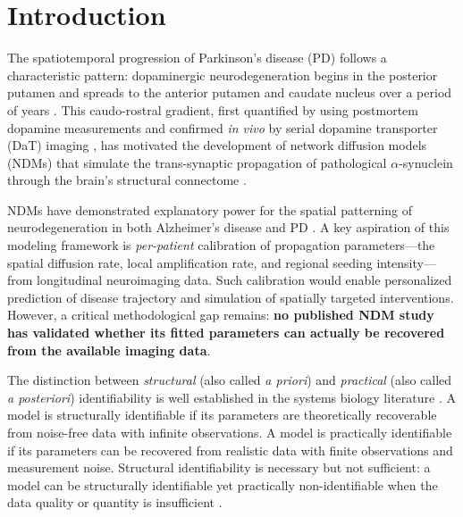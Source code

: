 \section{Introduction}

The spatiotemporal progression of Parkinson's disease (PD) follows a characteristic pattern: dopaminergic neurodegeneration begins in the posterior putamen and spreads to the anterior putamen and caudate nucleus over a period of years \cite{brooks1990, kim2022, fearnley1991}. This caudo-rostral gradient, first quantified by \cite{kish1988} using postmortem dopamine measurements and confirmed \textit{in vivo} by serial dopamine transporter (DaT) imaging \cite{fiorenzato2021, sung2016}, has motivated the development of network diffusion models (NDMs) that simulate the trans-synaptic propagation of pathological $\alpha$-synuclein through the brain's structural connectome \cite{raj2012, pandya2019, vogel2023}.

NDMs have demonstrated explanatory power for the spatial patterning of neurodegeneration in both Alzheimer's disease \cite{schafer2021, fornari2019} and PD \cite{pandya2019, zheng2019, abdelgawad2022}. A key aspiration of this modeling framework is \textit{per-patient} calibration of propagation parameters---the spatial diffusion rate, local amplification rate, and regional seeding intensity---from longitudinal neuroimaging data. Such calibration would enable personalized prediction of disease trajectory and simulation of spatially targeted interventions. However, a critical methodological gap remains: \textbf{no published NDM study has validated whether its fitted parameters can actually be recovered from the available imaging data}.

The distinction between \textit{structural} (also called \textit{a priori}) and \textit{practical} (also called \textit{a posteriori}) identifiability is well established in the systems biology literature \cite{raue2009, villaverde2016, wieland2021}. A model is structurally identifiable if its parameters are theoretically recoverable from noise-free data with infinite observations. A model is practically identifiable if its parameters can be recovered from realistic data with finite observations and measurement noise. Structural identifiability is necessary but not sufficient: a model can be structurally identifiable yet practically non-identifiable when the data quality or quantity is insufficient \cite{wang2025, conte2024}.

